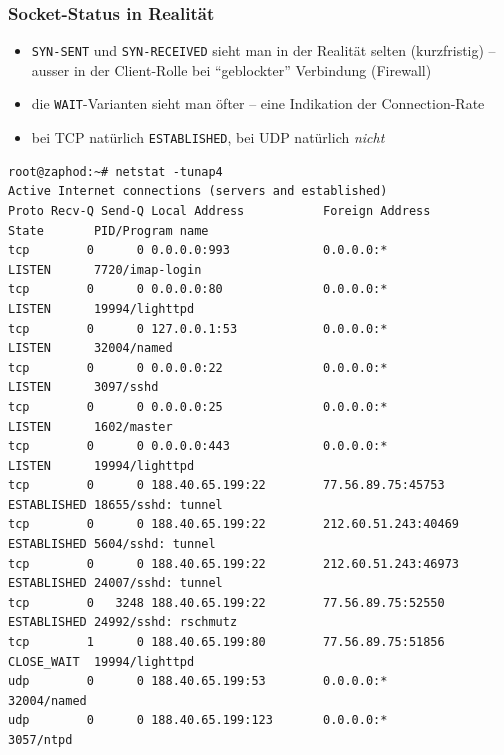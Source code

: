 \documentclass[ignorenonframetext]{beamer}
\begin{document}
\begin{frame}[fragile]
\frametitle{Socket-Status in Realit\"at}
\begin{small}
\begin{itemize}
  \item \texttt{SYN-SENT} und \texttt{SYN-RECEIVED} sieht man in der Realit\"at selten (kurzfristig) -- ausser in der Client-Rolle bei ``geblockter'' Verbindung (Firewall)
  \item die \texttt{WAIT}-Varianten sieht man \"ofter -- eine Indikation der Connection-Rate
  \item bei TCP nat\"urlich \texttt{ESTABLISHED}, bei UDP nat\"urlich {\em nicht}
\end{itemize}
\end{small}

	\begin{tiny}
	\begin{verbatim}
root@zaphod:~# netstat -tunap4
Active Internet connections (servers and established)
Proto Recv-Q Send-Q Local Address           Foreign Address         State       PID/Program name
tcp        0      0 0.0.0.0:993             0.0.0.0:*               LISTEN      7720/imap-login 
tcp        0      0 0.0.0.0:80              0.0.0.0:*               LISTEN      19994/lighttpd  
tcp        0      0 127.0.0.1:53            0.0.0.0:*               LISTEN      32004/named     
tcp        0      0 0.0.0.0:22              0.0.0.0:*               LISTEN      3097/sshd       
tcp        0      0 0.0.0.0:25              0.0.0.0:*               LISTEN      1602/master     
tcp        0      0 0.0.0.0:443             0.0.0.0:*               LISTEN      19994/lighttpd  
tcp        0      0 188.40.65.199:22        77.56.89.75:45753       ESTABLISHED 18655/sshd: tunnel 
tcp        0      0 188.40.65.199:22        212.60.51.243:40469     ESTABLISHED 5604/sshd: tunnel
tcp        0      0 188.40.65.199:22        212.60.51.243:46973     ESTABLISHED 24007/sshd: tunnel 
tcp        0   3248 188.40.65.199:22        77.56.89.75:52550       ESTABLISHED 24992/sshd: rschmutz
tcp        1      0 188.40.65.199:80        77.56.89.75:51856       CLOSE_WAIT  19994/lighttpd  
udp        0      0 188.40.65.199:53        0.0.0.0:*                           32004/named     
udp        0      0 188.40.65.199:123       0.0.0.0:*                           3057/ntpd       
	\end{verbatim}
	\end{tiny}
\end{frame}
\end{document}
